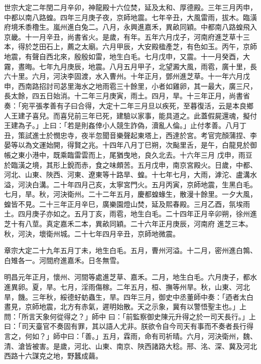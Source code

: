 \begin{pinyinscope}
 世宗大定二年閏二月辛卯，神龍殿十六位焚，延及太和、厚德殿。三年三月丙申，中都以南八路蝗。四年三月庚子夜，京師地震。七年辛丑，大風雷雨，拔木。臨潢
 府境禾黍穞生。嵐州進白兔二。八月，永興進嘉禾，異畝同穎。中都南八路蝗飛入京畿。十一月辛丑，尚書省火。是歲，有年。五年六月戊子，河南府進芝草十三本，得於芝田石上，薦之太廟。六月甲辰，大安殿楹產芝，有色如玉。丙午，京師地震，有聲自西北來，殷殷如雷，地生白毛。七月戊申，又震。十一月癸酉，大霧，晝晦。七年九月庚辰，地震。八月五月甲子，北望澱大風，雨雹，廣十里，長六十里。六月，河決李固渡，水入曹州。十年正月，鄧州進芝草。十一年六月戊申，西南路招討司苾里海水之地雨雹三十餘里，小者如雞卵，其一最大，廣三尺，
 長太餘，四五日始消。十二年三月庚寅，雨土。四月，旱。十三年正月，尚書省奏：「宛平張孝善有子曰合得，大定十二年三月旦以疾死，至暮復活，云是本良鄉人王建子喜兒。而喜兒前三年已死，建驗以家事，能具道之。此蓋假屍還魂，擬付王建為子。」上曰：「若是則姦倖小人競生詐偽，瀆亂人倫。」止付孝善。八月丁丑，策試進士於憫忠寺，夜半忽聞音樂聲起東塔上，西達於宮。考官完顏蒲捏、李晏等以為文運始開，得賢之兆。十四年八月丁巳朔，次颭里舌，是午，白龍見於御帳之東小港中，既乘臨雷雲而上，尾猶曳地，良久北去。十六年三月
 戊申，雨豆於臨潢之境，其形上銳而赤，食之味頗苦。五月戊申，南京宮殿火。日歲，中都、河北、山東、陜西、河東、遼東等十路旱、蝗。十七年七月，大雨，滹沱、盧溝水溢，河決白溝。二十年四月己亥，太寧宮門火。五月丙寅，京師地震，生黑白毛。七月，旱。秋，河決衛州。二十二年五月，慶都蝗蝝生，散漫十餘里。一夕大風，蝗皆不見。二十三年正月辛巳，廣樂園燈山焚，延及熙春殿。三月乙酉，氛埃雨土。四月庚子亦如之。五月丁亥，雨雹，地生白毛。二十四年正月辛卯朔，徐州進芝十有八莖。真定嘉禾二本，異畝同穎。二十六年正月庚辰，河南府
 進芝三本。秋，河決，壞衛州城。二十七年四月辛丑，京師地微震。



 章宗大定二十九年五月丁未，地生白毛。五月，曹州河溢。十二月，密州進白鶉、白雉各一。河間府進嘉禾。日冬無雪。



 明昌元年正月，懷州、河間等處進芝草、嘉禾。二月，地生白毛。六月庚子，都水進異卵。夏，旱。七月，淫雨傷稼。二年五月，桓、撫等州旱。秋，山東、河北旱，饑。三年秋，綏德虸蚄蟲生，旱。四年三月，御史中丞董師中奏：「迺者太白晝見，京師地震，北方有赤氣，遲明始散。天之示象，冀有以警悟聖主也。」上問：「所言天象何從得之？」師中
 曰：「前監察御史陳元升得之於一司天長行。」上曰：「司天臺官不奏固有罪，其以語人尤非。朕欲令自今司天有事而不奏者長行得言之，何如？」師中曰：「善。」五月，霖雨，命有司祈晴。六月，河決衛州，魏、清、滄皆被害。是歲，河北、山東、南京、陜西諸路大稔。邢、洺、深、冀及河北西路十六謀克之地，野蠶成繭。




\end{pinyinscope}
